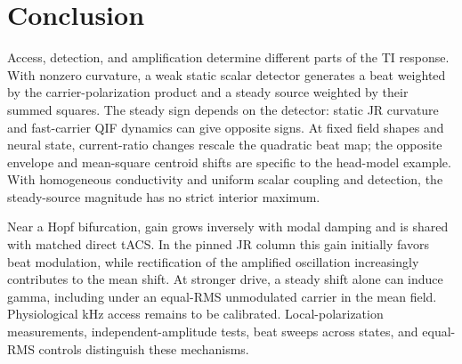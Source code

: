\section{Conclusion}
Access, detection, and amplification determine different parts of the TI response. With nonzero curvature, a weak static
scalar detector generates a beat weighted by the carrier-polarization product
and a steady source weighted by their summed squares. The steady sign depends on the detector: static JR
curvature and fast-carrier QIF dynamics can give opposite signs. At fixed
field shapes and neural state, current-ratio changes rescale the quadratic beat map; the opposite
envelope and mean-square centroid shifts are specific to the head-model example.
With homogeneous conductivity and uniform scalar coupling and detection,
the steady-source magnitude has no strict interior maximum.

Near a Hopf bifurcation, gain grows inversely with modal damping and is shared
with matched direct tACS. In the pinned JR column this gain initially
favors beat modulation, while rectification of the amplified oscillation
increasingly contributes to the mean shift.
At stronger drive, a steady shift alone can induce gamma, including under an
equal-RMS unmodulated carrier in the mean field. Physiological kHz access remains
to be calibrated. Local-polarization measurements, independent-amplitude tests,
beat sweeps across states, and equal-RMS controls distinguish these mechanisms.

